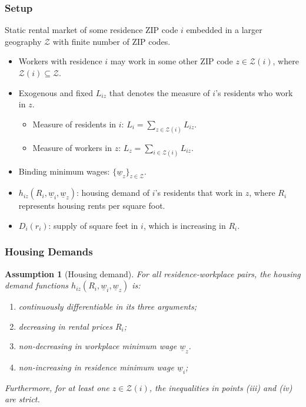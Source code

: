 \documentclass[aspectratio=169, t]{beamer}
\newtheorem{assu}{Assumption}
\newcommand{\Z}{\mathcal{Z}}
\newcommand{\MW}{\underline{w}}
\begin{document}
\begin{frame}
    \frametitle{Setup}
    
    Static rental market of some residence ZIP code $i$ embedded in a larger geography 
    $\Z$ with finite number of ZIP codes.    
    \begin{itemize}
		\item Workers with residence $i$ may work in some other ZIP code $z\in\Z(i)$, where 
		$\Z(i)\subseteq\Z$.

		\pause
		\vspace{2mm}
		\item Exogenous and fixed $L_{iz}$ that denotes the measure of $i$'s residents who work in $z$.
		\begin{itemize}
			\item Measure of residents in $i$: $L_i = \sum_{z \in \Z(i)} L_{iz}$.
			\item Measure of workers in $z$: $L_z = \sum_{i \in \Z(i)} L_{iz}$.
		\end{itemize}
	
		\pause
		\item Binding minimum wages: $\{\MW_z\}_{z\in\Z}$.
		
		\pause
		\vspace{2mm}
		\item $h_{i z} (R_i, \MW_i, \MW_z)$: housing demand of $i$'s residents that work in $z$, where $R_i$ 
		represents housing rents per square foot.

		\pause
		\vspace{2mm}
		\item $D_i \left(r_i \right)$: supply of square feet in $i$, which is increasing in $R_i$.

	\end{itemize}
\end{frame}

\begin{frame}
    \frametitle{Housing Demands}
   
\begin{assu}[Housing demand]\label{assu:housing_function}
    For all residence-workplace pairs, the housing demand functions $h_{iz} (R_i, \MW_i, \MW_z)$ is:
    \begin{enumerate}
        \item continuously differentiable in its three arguments;
        \item decreasing in rental prices $R_i$;
        \item non-decreasing in workplace minimum wage $\MW_z$.
        \item non-increasing in residence minimum wage $\MW_i$;
    \end{enumerate}
    Furthermore, for at least one $z\in\Z(i)$, the inequalities in points (iii)
    and (iv) are strict.
\end{assu}
\end{frame}
\end{document}
